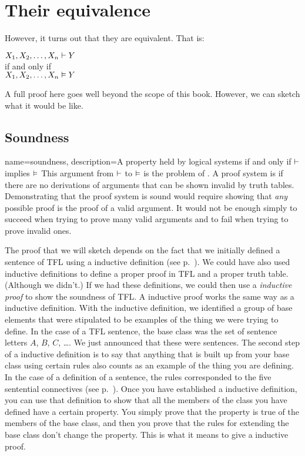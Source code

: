 \section{Their equivalence}
However, it turns out that they are equivalent.
That is:
\begin{center}
$X_1, X_2, \ldots, X_n \vdash Y$\\if and only if\\
$X_1, X_2, \ldots, X_n \vDash Y$
\end{center}
A full proof here goes well beyond the scope of this book. However, we can sketch what it would be like.

\subsection{Soundness}

{
name=soundness,
description={A property held by logical systems if and only if $\vdash $ implies $\vDash $}
}
This argument from $\vdash $ to $\vDash $ is the problem of . \label{def:soundness} A proof system is  if there are no derivations of arguments that can be shown invalid by truth tables. \label{def_Soundness} Demonstrating that the proof system is sound would require showing that \emph{any} possible proof is the proof of a valid argument. It would not be enough simply to succeed when trying to prove many valid arguments and to fail when trying to prove invalid ones.

The proof that we will sketch depends on the fact that we initially defined a sentence of TFL using a inductive definition (see p.~\pageref{TFLsentences}). We could have also used inductive definitions to define a proper proof in TFL and a proper truth table. (Although we didn't.) If we had these definitions, we could then use a \emph{inductive proof} to show the soundness of TFL. A inductive proof works the same way as a inductive definition. With the inductive definition, we identified a group of base elements that were stipulated to be examples of the thing we were trying to define. In the case of a TFL sentence, the base class was the set of sentence letters $A$, $B$, $C$, \dots. We just announced that these were sentences. The second step of a inductive definition is to say that anything that is built up from your base class using certain rules also counts as an example of the thing you are defining. In the case of a definition of a sentence, the rules corresponded to the five sentential connectives (see p.~\pageref{TFLsentences}). Once you have established a inductive definition, you can use that definition to show that all the members of the class you have defined have a certain property. You simply prove that the property is true of the members of the base class, and then you prove that the rules for extending the base class don't change the property. This is what it means to give a inductive proof.

